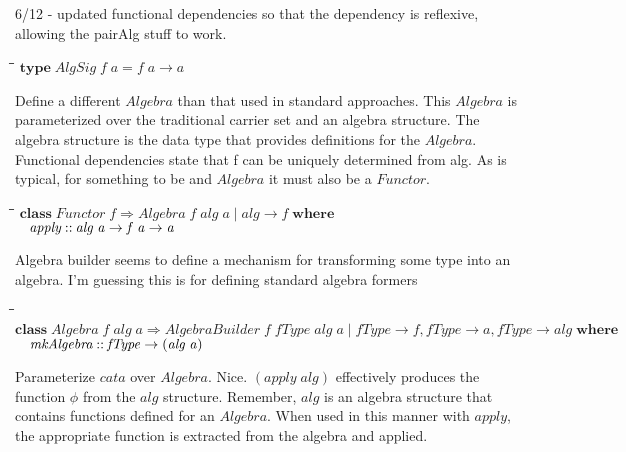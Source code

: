 \documentclass[10pt]{article}
\newlength{\lwidth}\setlength{\lwidth}{4.5cm}
\newlength{\cwidth}\setlength{\cwidth}{8mm} %
\newcommand{\Conid}[1]{\mathit{#1}}
\newcommand{\Varid}[1]{\mathit{#1}}
\begin{document}
6/12 - updated functional dependencies so that the dependency is
reflexive, allowing the pairAlg stuff to work.

\begin{tabbing}
\qquad\=\hspace{\lwidth}\=\hspace{\cwidth}\=\+\kill
${\mathbf{type}\;\Conid{AlgSig}\;\Varid{f}\;\Varid{a}\mathrel{=}\Varid{f}\;\Varid{a}\to \Varid{a}}$
\end{tabbing}
Define a different \ensuremath{\Conid{Algebra}} than that used in standard approaches.
This \ensuremath{\Conid{Algebra}} is parameterized over the traditional carrier set and
an algebra structure.  The algebra structure is the data type that
provides definitions for the \ensuremath{\Conid{Algebra}}.  Functional dependencies state
that f can be uniquely determined from alg.  As is typical, for something to be and \ensuremath{\Conid{Algebra}} it must also be a \ensuremath{\Conid{Functor}}.

\begin{tabbing}
\qquad\=\hspace{\lwidth}\=\hspace{\cwidth}\=\+\kill
${\mathbf{class}\;\Conid{Functor}\;\Varid{f}\Rightarrow \Conid{Algebra}\;\Varid{f}\;\Varid{alg}\;\Varid{a}\mid \Varid{alg}\to \Varid{f}\;\mathbf{where}}$\\
${\hskip1.00em\relax\Varid{apply}\mathbin{::}\Varid{alg}\;\Varid{a}\to \Varid{f}\;\Varid{a}\to \Varid{a}}$
\end{tabbing}
Algebra builder seems to define a mechanism for transforming some type
into an algebra.  I'm guessing this is for defining standard algebra
formers

\begin{tabbing}
\qquad\=\hspace{\lwidth}\=\hspace{\cwidth}\=\+\kill
${\mathbf{class}\;\Conid{Algebra}\;\Varid{f}\;\Varid{alg}\;\Varid{a}\Rightarrow \Conid{AlgebraBuilder}\;\Varid{f}\;\Varid{fType}\;\Varid{alg}\;\Varid{a}\mid \Varid{fType}\to \Varid{f},\Varid{fType}\to \Varid{a},\Varid{fType}\to \Varid{alg}\;\mathbf{where}}$\\
${\hskip1.00em\relax\Varid{mkAlgebra}\mathbin{::}\Varid{fType}\to (\Varid{alg}\;\Varid{a})}$
\end{tabbing}
Parameterize \ensuremath{\Varid{cata}} over \ensuremath{\Conid{Algebra}}.  Nice.  \ensuremath{(\Varid{apply}\;\Varid{alg})} effectively
produces the function \ensuremath{\Varid{\phi}} from the \ensuremath{\Varid{alg}} structure.  Remember, \ensuremath{\Varid{alg}}
is an algebra structure that contains functions defined for an
\ensuremath{\Conid{Algebra}}.  When used in this manner with \ensuremath{\Varid{apply}}, the appropriate
function is extracted from the algebra and applied.
\end{document}
